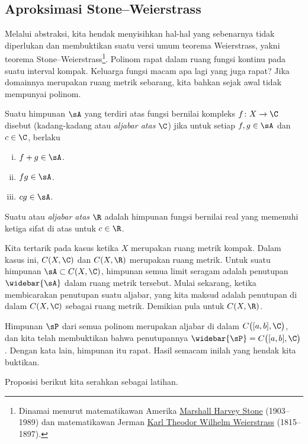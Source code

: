 \subsection{Aproksimasi Stone--Weierstrass}

Melalui abstraksi, kita hendak menyisihkan hal-hal yang sebenarnya tidak
diperlukan dan membuktikan suatu versi umum teorema Weierstrass, yakni teorema
Stone--Weierstrass\footnote{%
Dinamai menurut matematikawan Amerika
\href{https://en.wikipedia.org/wiki/Marshall_Harvey_Stone}{Marshall Harvey Stone}
(1903--1989) dan matematikawan Jerman
\href{https://en.wikipedia.org/wiki/Karl_Weierstrass}{Karl Theodor Wilhelm Weierstrass}
(1815--1897).}.
Polinom rapat dalam ruang fungsi kontinu pada suatu interval kompak. Keluarga
fungsi macam apa lagi yang juga rapat? Jika domainnya merupakan ruang metrik
sebarang, kita bahkan sejak awal tidak mempunyai polinom.

\begin{defn}
\pagebreak[2]
Suatu himpunan $\sA$ yang terdiri atas fungsi bernilai kompleks
$f \colon X \to \C$ disebut \emph{} (kadang-kadang
\emph{} atau \emph{aljabar atas $\C$}) jika untuk
setiap $f,
g \in \sA$ dan $c \in \C$, berlaku
\begin{enumerate}[(i)]
\item $f+g \in \sA$.
\item $fg \in \sA$.
\item $cg \in \sA$.
\end{enumerate}
Suatu \emph{} atau \emph{aljabar atas $\R$} adalah
himpunan fungsi bernilai real yang memenuhi ketiga sifat di atas untuk
$c \in \R$.
\end{defn}

Kita tertarik pada kasus ketika $X$ merupakan ruang metrik kompak. Dalam kasus
ini, $C(X,\C)$ dan $C(X,\R)$ merupakan ruang metrik. Untuk suatu himpunan
$\sA \subset C(X,\C)$, himpunan semua limit seragam adalah penutupan
$\widebar{\sA}$ dalam ruang metrik tersebut. Mulai sekarang, ketika membicarakan
penutupan suatu aljabar, yang kita maksud adalah penutupan di dalam $C(X,\C)$
sebagai ruang metrik. Demikian pula untuk $C(X,\R)$.

Himpunan $\sP$ dari semua polinom merupakan aljabar di dalam
$C\bigl([a,b],\C\bigr)$, dan kita telah membuktikan bahwa penutupannya
$\widebar{\sP} = C\bigl([a,b],\C\bigr)$. Dengan kata lain, himpunan itu rapat.
Hasil semacam inilah yang hendak kita buktikan.

Proposisi berikut kita serahkan sebagai latihan.

